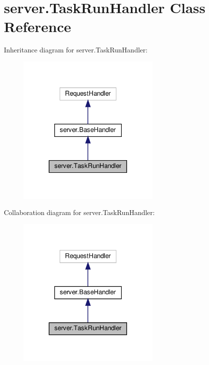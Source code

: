 \hypertarget{classserver_1_1TaskRunHandler}{}\section{server.\+Task\+Run\+Handler Class Reference}
\label{classserver_1_1TaskRunHandler}


Inheritance diagram for server.\+Task\+Run\+Handler\+:
\nopagebreak
\begin{figure}[H]
\begin{center}
\leavevmode
\includegraphics[width=200pt]{classserver_1_1TaskRunHandler__inherit__graph}
\end{center}
\end{figure}


Collaboration diagram for server.\+Task\+Run\+Handler\+:
\nopagebreak
\begin{figure}[H]
\begin{center}
\leavevmode
\includegraphics[width=200pt]{classserver_1_1TaskRunHandler__coll__graph}
\end{center}
\end{figure}
